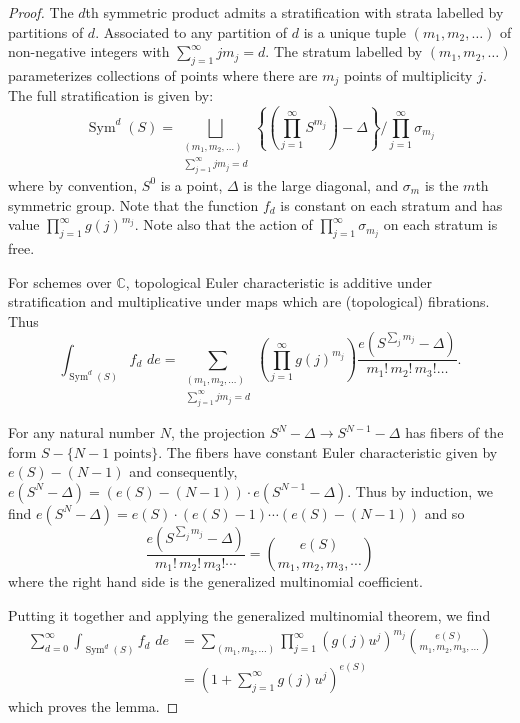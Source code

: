 \documentclass{amsart}
\theoremstyle{definition}
\newcommand{\CC} {\mathbb{C}}          %
\newcommand{\Sym}{\operatorname{Sym}}
\begin{document}
\begin{proof}
The $d$th symmetric product admits a stratification with strata
labelled by partitions of $d$. Associated to any partition of $d$ is a
unique tuple $(m_{1},m_{2},\dots )$ of non-negative integers with
$\sum _{j=1}^{\infty }j m_{j}=d$. The stratum labelled by
$(m_{1},m_{2},\dots )$ parameterizes collections of points where there
are $m_{j}$ points of multiplicity $j$. The full stratification is
given by:
\[
\Sym ^{d} (S) = \bigsqcup_{\begin{smallmatrix} (m_{1},m_{2},\dots )\\
\sum _{j=1}^{\infty }j m_{j}=d  \end{smallmatrix}} \left\{\left(\prod _{j=1}^{\infty }S^{m_{j}} \right) -\Delta  \right\}/ \prod _{j=1}^{\infty }\sigma _{m_{j}} 
\]
where by convention, $S^{0}$ is a point, $\Delta $ is the large
diagonal, and $\sigma _{m}$ is the $m$th symmetric group. Note that
the function $f_{d}$ is constant on each stratum and has value $\prod
_{j=1}^{\infty }g (j)^{m_{j}}$. Note also that the action of $\prod
_{j=1}^{\infty }\sigma _{m_{j}}$ on each stratum is free. 

For schemes over $\CC $, topological Euler characteristic is additive
under stratification and multiplicative under maps which are
(topological) fibrations. Thus
\[
\int _{\Sym ^{d} (S)} f_{d}\,\, de = \sum _{\begin{smallmatrix}(m_{1},m_{2},\dots )\\
\sum _{j=1}^{\infty }j m_{j}=d   \end{smallmatrix}} \left(\prod _{j=1}^{\infty } g (j)^{m_{j}} \right) \frac{e (S^{\sum _{j}m_{j}}-\Delta )}{m_{1}!\, m_{2}!\, m_{3}!\dots }.
\]

For any natural number $N$, the projection $S^{N}-\Delta \to
S^{N-1}-\Delta $ has fibers of the form $S-\{N-1\text{ points}
\}$. The fibers have constant Euler characteristic given by $e (S)-
(N-1)$ and consequently, $e (S^{N}-\Delta )= (e (S)- (N-1))\cdot e
(S^{N-1}-\Delta )$. Thus by induction, we find $e (S^{N}-\Delta ) = e
(S)\cdot (e (S)-1)\cdots (e (S)- (N-1))$ and so 
\[
\frac{e (S^{\sum _{j}m_{j}}-\Delta )}{m_{1}!\,m_{2}!\,m_{3}!\cdots } = \binom{e (S)}{m_{1},m_{2},m_{3},\cdots }
\]
where the right hand side is the generalized multinomial coefficient.

Putting it together and applying the generalized multinomial theorem,
we find
\begin{align*}
\sum _{d=0}^{\infty } \int _{\Sym ^{d} (S)}f_{d}\,\,de & = \sum _{(m_{1},m_{2},\dots )} \prod _{j=1}^{\infty } \left(g (j) u^{j} \right)^{m_{j}} \binom{e (S)}{m_{1},m_{2},m_{3},\dots }\\
&=\left(1+\sum _{j=1}^{\infty }g (j) u^{j} \right)^{e (S)}
\end{align*}
which proves the lemma.   
\end{proof}
\end{document}
